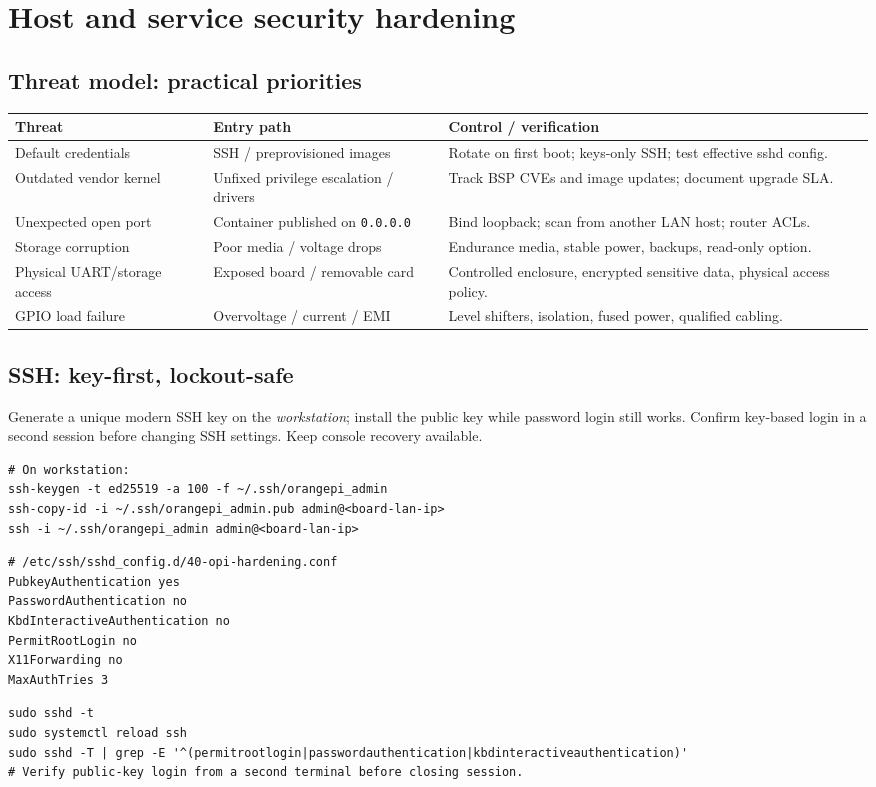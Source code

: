 \documentclass[10pt,oneside,openany]{report}
\newcommand{\code}[1]{\texttt{#1}}
\begin{document}
\chapter{Host and service security hardening}
\section{Threat model: practical priorities}
\begin{center}\small\begin{tabularx}{\textwidth}{@{}p{2.7cm}X X@{}}\toprule
\textbf{Threat} & \textbf{Entry path} & \textbf{Control / verification}\\\midrule
Default credentials & SSH / preprovisioned images & Rotate on first boot; keys-only SSH; test effective sshd config.\\
Outdated vendor kernel & Unfixed privilege escalation / drivers & Track BSP CVEs and image updates; document upgrade SLA.\\
Unexpected open port & Container published on \code{0.0.0.0} & Bind loopback; scan from another LAN host; router ACLs.\\
Storage corruption & Poor media / voltage drops & Endurance media, stable power, backups, read-only option.\\
Physical UART/storage access & Exposed board / removable card & Controlled enclosure, encrypted sensitive data, physical access policy.\\
GPIO load failure & Overvoltage / current / EMI & Level shifters, isolation, fused power, qualified cabling.\\\bottomrule\end{tabularx}\end{center}
\section{SSH: key-first, lockout-safe}
Generate a unique modern SSH key on the \emph{workstation}; install the public key while password login still works. Confirm key-based login in a second session before changing SSH settings. Keep console recovery available.
\begin{lstlisting}[style=sh]
# On workstation:
ssh-keygen -t ed25519 -a 100 -f ~/.ssh/orangepi_admin
ssh-copy-id -i ~/.ssh/orangepi_admin.pub admin@<board-lan-ip>
ssh -i ~/.ssh/orangepi_admin admin@<board-lan-ip>
\end{lstlisting}
\begin{lstlisting}[style=config]
# /etc/ssh/sshd_config.d/40-opi-hardening.conf
PubkeyAuthentication yes
PasswordAuthentication no
KbdInteractiveAuthentication no
PermitRootLogin no
X11Forwarding no
MaxAuthTries 3
\end{lstlisting}
\begin{lstlisting}[style=sh]
sudo sshd -t
sudo systemctl reload ssh
sudo sshd -T | grep -E '^(permitrootlogin|passwordauthentication|kbdinteractiveauthentication)'
# Verify public-key login from a second terminal before closing session.
\end{lstlisting}
\end{document}
